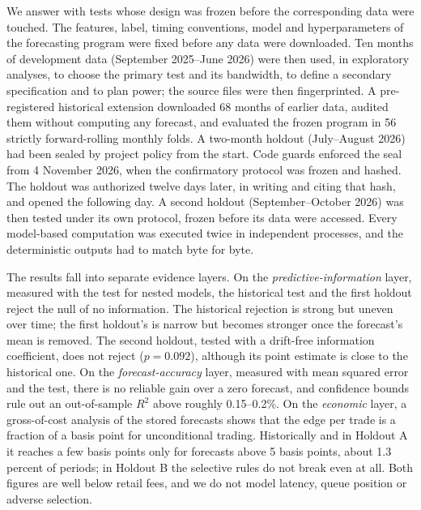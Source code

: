 \documentclass[11pt]{article}
\begin{document}
We answer with tests whose design was frozen before the corresponding data were touched. The features, label, timing conventions, model and hyperparameters of the forecasting program were fixed before any data were downloaded. Ten months of development data (September 2025--June 2026) were then used, in exploratory analyses, to choose the primary test and its bandwidth, to define a secondary specification and to plan power; the source files were then fingerprinted. A pre-registered historical extension downloaded 68 months of earlier data, audited them without computing any forecast, and evaluated the frozen program in 56 strictly forward-rolling monthly folds. A two-month holdout (July--August 2026) had been sealed by project policy from the start. Code guards enforced the seal from 4 November 2026, when the confirmatory protocol was frozen and hashed. The holdout was authorized twelve days later, in writing and citing that hash, and opened the following day. A second holdout (September--October 2026) was then tested under its own protocol, frozen before its data were accessed. Every model-based computation was executed twice in independent processes, and the deterministic outputs had to match byte for byte.

The results fall into separate evidence layers. On the \emph{predictive-information} layer, measured with the \citet{clarkwest2007} test for nested models, the historical test and the first holdout reject the null of no information. The historical rejection is strong but uneven over time; the first holdout's is narrow but becomes stronger once the forecast's mean is removed. The second holdout, tested with a drift-free information coefficient, does not reject ($p=0.092$), although its point estimate is close to the historical one. On the \emph{forecast-accuracy} layer, measured with mean squared error and the \citet{dieboldmariano1995} test, there is no reliable gain over a zero forecast, and confidence bounds rule out an out-of-sample $R^2$ above roughly 0.15--0.2\%. On the \emph{economic} layer, a gross-of-cost analysis of the stored forecasts shows that the edge per trade is a fraction of a basis point for unconditional trading. Historically and in Holdout A it reaches a few basis points only for forecasts above 5 basis points, about 1.3 percent of periods; in Holdout B the selective rules do not break even at all. Both figures are well below retail fees, and we do not model latency, queue position or adverse selection.
\end{document}

